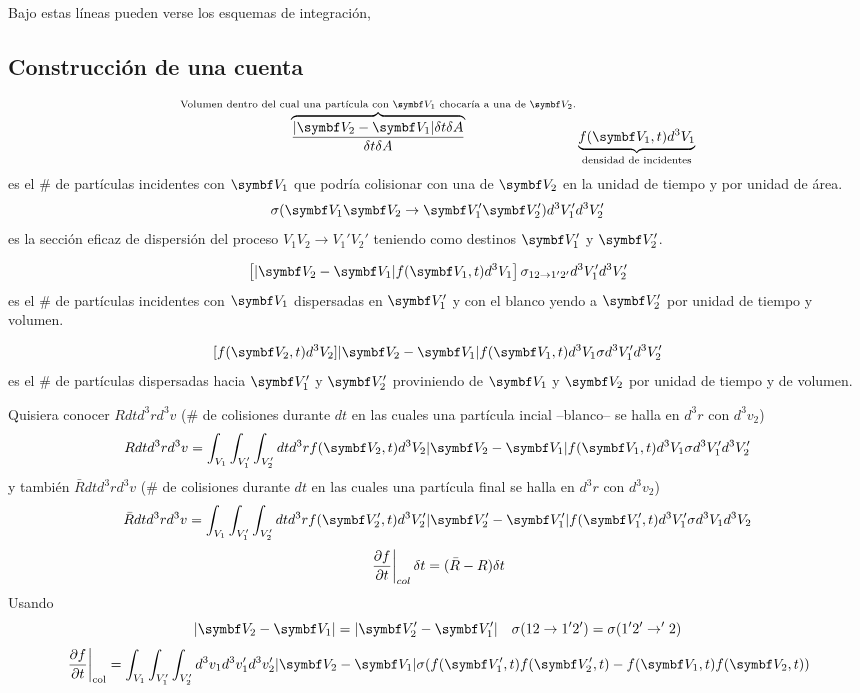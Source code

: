 \documentclass[10pt,oneside]{CBFT_book}
\begin{document}
Bajo estas líneas pueden verse los esquemas de integración,


\subsection{Construcción de una cuenta}

\[
	\overbrace{\frac{|\vb{V}_2-\vb{V}_1|\delta t \delta A}{\delta t \delta A}}^{\text{Volumen dentro
	del cual una partícula con $\vb{V}_1$ chocaría a una de $\vb{V}_2$.}}
	\underbrace{f(\vb{V}_1,t) d^3V_1}_{\text{densidad de incidentes}}
\]
es el \# de partículas incidentes con $\vb{V}_1$ que podría colisionar con una de $\vb{V}_2$ en la unidad
de tiempo y por unidad de área.
\[
	\sigma (\vb{V}_1\vb{V}_2 \to \vb{V}_1' \vb{V}_2') d^3V_1' d^3V_2'
\]
es la sección eficaz de dispersión del proceso $V_1V_2 \to V_1'V_2'$ teniendo como destinos $\vb{V}_1'$ y
$\vb{V}_2'$.

\[
	\left[ |\vb{V}_2-\vb{V}_1| f(\vb{V}_1,t) d^3V_1 \right] \sigma_{ 12 \to 1'2'} d^3V_1' d^3V_2'
\]
es el \# de partículas incidentes con $\vb{V}_1$ dispersadas en $\vb{V}_1'$ y con el blanco yendo a $\vb{V}_2'$
por unidad de tiempo y volumen.

\[
	[ f(\vb{V}_2,t) d^3V_2 ] |\vb{V}_2-\vb{V}_1| f(\vb{V}_1,t) d^3V_1 \sigma d^3V_1' d^3V_2'
\]
es el \# de partículas dispersadas hacia $\vb{V}_1'$ y $\vb{V}_2'$ proviniendo de $\vb{V}_1$ y $\vb{V}_2$ por 
unidad de tiempo y de volumen.

Quisiera conocer $R dt d^3r d^3v$ (\# de colisiones durante $dt$ en las cuales una partícula incial --blanco-- se
halla en $d^3r$ con $d^3v_2$)
\[
	R dt d^3r d^3v = \int_{V_1}\int_{V_1'}\int_{V_2'} dt d^3r 
	f(\vb{V}_2,t) d^3V_2 |\vb{V}_2-\vb{V}_1| f(\vb{V}_1,t) d^3V_1 \sigma d^3V_1' d^3V_2'
\]
y también $\bar{R} dt d^3r d^3v$ (\# de colisiones durante $dt$ en las cuales una partícula final se halla en 
$d^3r$ con $d^3v_2$)
\[
	\bar{R} dt d^3r d^3v = \int_{V_1}\int_{V_1'}\int_{V_2'} dt d^3r 
	f(\vb{V}_2',t) d^3V_2' |\vb{V}_2'-\vb{V}_1'| f(\vb{V}_1',t) d^3V_1' \sigma d^3V_1 d^3V_2
\]
\[
	\left. \frac{\partial^{\hspace{-0.05em}} {f}}{\partial {t}^{\hspace{-0.05em}}}\right|_{col} \delta t = (\bar{R} - R)\delta t
\]
Usando
\[
	|\vb{V}_2 - \vb{V}_1| = |\vb{V}_2' - \vb{V}_1'| \quad \sigma(12 \to 1'2') = \sigma(1'2' \to '2)
\]
\[
	\left. \dpar{f}{t} \right|_{\text{col}} =
	\int_{V_1} \int_{V_1'} \int_{V_2'} d^3v_1 d^3v_1' d^3v_2' |\vb{V}_2 - \vb{V}_1| \sigma 
	( f(\vb{V}_1',t)f(\vb{V}_2',t) - f(\vb{V}_1,t)f(\vb{V}_2,t) ) 
\]
\end{document}
